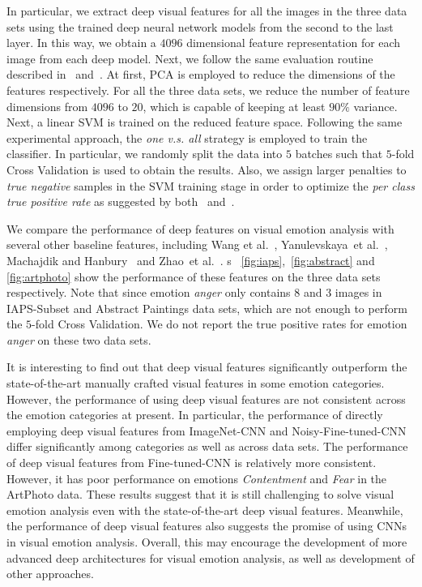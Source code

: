 \documentclass[letterpaper]{article}
\begin{document}
In particular, we extract deep visual features for all the images in the three data sets using the trained deep neural network models from the second to the last layer. In this way, we obtain a $4096$ dimensional feature representation for each image from each deep model. Next, we follow the same evaluation routine described in~\cite{machajdik2010affective} and~\cite{zhou2014learning}. At first, PCA is employed to reduce the dimensions of the features respectively. For all the three data sets, we reduce the number of feature dimensions from $4096$ to $20$, which is capable of keeping at least $90\%$ variance. Next, a linear SVM is trained on the reduced feature space. Following the same experimental approach, the \textit{one v.s. all} strategy is employed to train the classifier. In particular, we randomly split the data into $5$ batches such that $5$-fold Cross Validation is used to obtain the results. Also, we assign larger penalties to \textit{true negative} samples in the SVM training stage in order to optimize the \textit{per class true positive rate} as suggested by both~\cite{machajdik2010affective} and~\cite{zhou2014learning}.

We compare the performance of deep features on visual emotion analysis with several other baseline features, including Wang et al.~\cite{wei2006image}, Yanulevskaya~et al.~\cite{yanulevskaya2008emotional}, Machajdik and Hanbury~\cite{machajdik2010affective} and Zhao~et al.~\cite{zhou2014learning}. {\figurename}s ~\ref{fig:iaps},~\ref{fig:abstract} and \ref{fig:artphoto} show the performance of these features on the three data sets respectively. Note that since emotion \textit{anger} only contains $8$ and $3$ images in IAPS-Subset and Abstract Paintings data sets, which are not enough to perform the $5$-fold Cross Validation. We do not report the true positive rates for emotion \textit{anger} on these two data sets.

It is interesting to find out that deep visual features significantly outperform the state-of-the-art manually crafted visual features in some emotion categories. However, the performance of using deep visual features are not consistent across the emotion categories at present. In particular, the performance of directly employing deep visual features from ImageNet-CNN and Noisy-Fine-tuned-CNN differ significantly among categories as well as across data sets. The performance of deep visual features from Fine-tuned-CNN is relatively more consistent. However, it has poor performance on emotions \textit{Contentment} and \textit{Fear} in the ArtPhoto data. These results suggest that it is still challenging to solve visual emotion analysis even with the state-of-the-art deep visual features. Meanwhile, the performance of deep visual features also suggests the promise of using CNNs in visual emotion analysis. Overall, this may encourage the development of more advanced deep architectures for visual emotion analysis, as well as development of other approaches.
\end{document}
